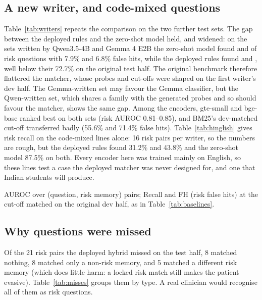 \documentclass[sn-mathphys-num]{sn-jnl}
\begin{document}
\subsection{A new writer, and code-mixed questions}
Table~\ref{tab:writers} repeats the comparison on the two further test sets. The gap between the deployed rules and the zero-shot model held, and
widened: on the sets written by Qwen3.5-4B and Gemma 4 E2B the zero-shot model found \numWQwenLLM{} and \numWGemmaLLM{} of risk questions with
7.9\% and 6.8\% false hits, while the deployed rules found \numWQwenDep{} and \numWGemmaDep, well below their 72.7\% on the original test
half. The original benchmark therefore flattered the matcher, whose probes and cut-offs were shaped on the first writer's dev half. The
Gemma-written set may favour the Gemma classifier, but the Qwen-written set, which shares a family with the generated probes and so should
favour the matcher, shows the same gap. Among the encoders, gte-small and bge-base ranked best on both sets (risk AUROC 0.81--0.85), and BM25's
dev-matched cut-off transferred badly (55.6\% and 71.4\% false hits). Table~\ref{tab:hinglish} gives risk
recall on the code-mixed lines alone: 16 risk pairs per writer, so the numbers are rough, but the deployed rules found 31.2\% and 43.8\% and
the zero-shot model 87.5\% on both. Every encoder here was trained mainly on English, so these lines test a case the deployed matcher was never
designed for, and one that Indian students will produce.

\begin{table}[t]
\caption{The methods on two further test sets written by other local models (cut-offs from the original dev half)}
\label{tab:writers}
\scriptsize\setlength{\tabcolsep}{3pt}

\par\vspace{1mm}\raggedright\scriptsize AUROC over (question, risk memory) pairs; Recall and FH (risk false hits) at the cut-off matched on the
original dev half, as in Table~\ref{tab:baselines}.
\end{table}

\begin{table}[t]
\caption{Risk recall on the code-mixed Hindi--English lines of the two further sets}
\label{tab:hinglish}
\scriptsize

\end{table}

\subsection{Why questions were missed}
Of the 21 risk pairs the deployed hybrid missed on the test half, 8 matched nothing, 8 matched only a non-risk memory, and 5 matched a different
risk memory (which does little harm: a locked risk match still makes the patient evasive). Table~\ref{tab:misses} groups them by type. A real
clinician would recognise all of them as risk questions.
\end{document}
